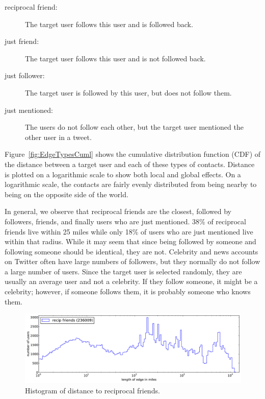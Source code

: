 \documentclass[letterpaper]{article}
\begin{document}
\begin{description}
\item[reciprocal friend:] The target user follows this user and is followed
    back.
\item[just friend:] The target user follows this user and is not followed
    back.
\item[just follower:] The target user is followed by this user, but does
    not follow them.
\item[just mentioned:] The users do not follow each other, but the target
    user mentioned the other user in a tweet.
\end{description}

Figure~\ref{fig:EdgeTypesCuml} shows the cumulative distribution
function (CDF) of the distance between a target user and each of these types of
contacts.
%
Distance is plotted on a logarithmic scale to show both local and
global effects.
%
On a logarithmic scale, the contacts are fairly evenly distributed from being
nearby to being on the opposite side of the world.
%
%
%

In general, we observe that reciprocal friends are the closest, followed by followers, friends,
and finally users who are just mentioned.
%
38\% of reciprocal friends live within 25 miles while only 18\% of users
who are just mentioned live within that radius.
%
While it may seem that since being followed by someone and following someone
should be identical, they are not.
%
Celebrity and news accounts on Twitter often have large numbers of followers,
but they normally do not follow a large number of users.
%
Since the target user is selected randomly, they are usually an average
user and not a celebrity.
%
If they follow someone, it might be a celebrity; however, if someone follows
them, it is probably someone who knows them.

\begin{figure}[tb]
\centering
\includegraphics[width=.9\linewidth]{figures/rfrd_norm.pdf}
\caption{
Histogram of distance to reciprocal friends.
}
\label{fig:EdgeTypes}
\end{figure}
\end{document}
